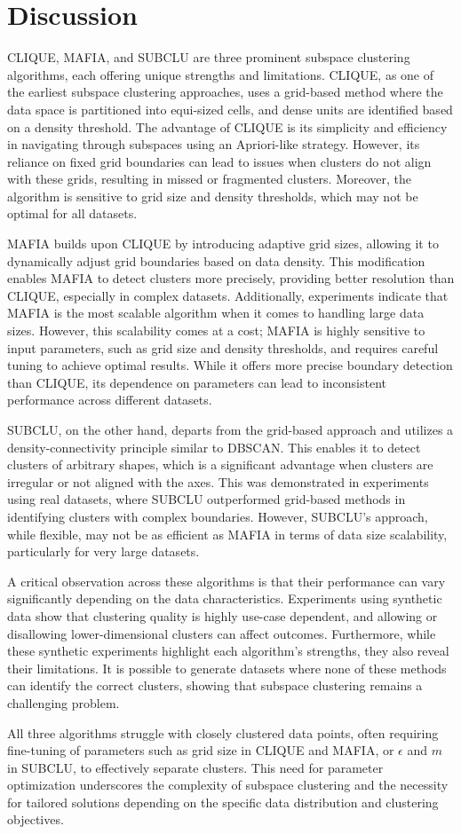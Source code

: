 \section{Discussion}
CLIQUE, MAFIA, and SUBCLU are three prominent subspace clustering algorithms, each offering unique strengths and limitations. CLIQUE, as one of the earliest subspace clustering approaches, uses a grid-based method where the data space is partitioned into equi-sized cells, and dense units are identified based on a density threshold. The advantage of CLIQUE is its simplicity and efficiency in navigating through subspaces using an Apriori-like strategy. However, its reliance on fixed grid boundaries can lead to issues when clusters do not align with these grids, resulting in missed or fragmented clusters. Moreover, the algorithm is sensitive to grid size and density thresholds, which may not be optimal for all datasets.

MAFIA builds upon CLIQUE by introducing adaptive grid sizes, allowing it to dynamically adjust grid boundaries based on data density. This modification enables MAFIA to detect clusters more precisely, providing better resolution than CLIQUE, especially in complex datasets. Additionally, experiments indicate that MAFIA is the most scalable algorithm when it comes to handling large data sizes. However, this scalability comes at a cost; MAFIA is highly sensitive to input parameters, such as grid size and density thresholds, and requires careful tuning to achieve optimal results. While it offers more precise boundary detection than CLIQUE, its dependence on parameters can lead to inconsistent performance across different datasets.

SUBCLU, on the other hand, departs from the grid-based approach and utilizes a density-connectivity principle similar to DBSCAN. This enables it to detect clusters of arbitrary shapes, which is a significant advantage when clusters are irregular or not aligned with the axes. This was demonstrated in experiments using real datasets, where SUBCLU outperformed grid-based methods in identifying clusters with complex boundaries. However, SUBCLU’s approach, while flexible, may not be as efficient as MAFIA in terms of data size scalability, particularly for very large datasets.

A critical observation across these algorithms is that their performance can vary significantly depending on the data characteristics. Experiments using synthetic data show that clustering quality is highly use-case dependent, and allowing or disallowing lower-dimensional clusters can affect outcomes. Furthermore, while these synthetic experiments highlight each algorithm’s strengths, they also reveal their limitations. It is possible to generate datasets where none of these methods can identify the correct clusters, showing that subspace clustering remains a challenging problem.

All three algorithms struggle with closely clustered data points, often requiring fine-tuning of parameters such as grid size in CLIQUE and MAFIA, or \( \epsilon \) and \( m \) in SUBCLU, to effectively separate clusters. This need for parameter optimization underscores the complexity of subspace clustering and the necessity for tailored solutions depending on the specific data distribution and clustering objectives.